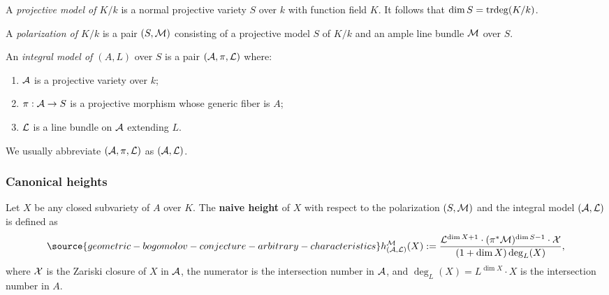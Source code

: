 A \emph{projective model of $K/k$} is a normal projective variety $S$ over $k$ with function field $K$.
It follows that $\dim S={\mathrm{trdeg}}(K/k)$.

A \emph{polarization of $K/k$} is a pair $(S, {\mathcal M})$ consisting of a projective model $S$ of $K/k$ and an ample line bundle ${\mathcal M}$ over $S$.

An \emph{integral model of $(A,L)$} over $S$ is a pair $({\mathcal A}, \pi, {\mathcal L})$ where:
\begin{enumerate}
\item[$\bullet$] ${\mathcal A}$ is a projective variety over $k$;
\item[$\bullet$] $\pi: {\mathcal A}\to S$ is a projective morphism whose generic fiber is $A$;
\item[$\bullet$] ${\mathcal L}$ is a line bundle on ${\mathcal A}$ extending $L$.
\end{enumerate}
We usually abbreviate $({\mathcal A}, \pi, {\mathcal L})$ as $({\mathcal A}, {\mathcal L})$.

\subsubsection{Canonical heights}

Let $X$ be any closed subvariety of $A$ over $K$.
The {\bf{naive height}} of $X$ with respect to the polarization $(S,{\mathcal M})$
and the integral model $({\mathcal A}, {\mathcal L})$ is defined as
\begin{equation}
\label{eq:naiveheight}
\source{geometric-bogomolov-conjecture-arbitrary-characteristics}
h_{(\sA,\sL)}^{\sM}(X):=\frac{\sL^{\dim X+1}\cdot (\pi^*\sM)^{\dim S-1}\cdot \sX}{(1+\dim X)\deg_L(X)},
\end{equation}
where ${\mathcal X}$ is the Zariski closure of $X$ in ${\mathcal A}$, the numerator is the intersection number in ${\mathcal A}$, and $\deg_L(X)=L^{\dim X}\cdot X$
is the intersection number in $A$.

